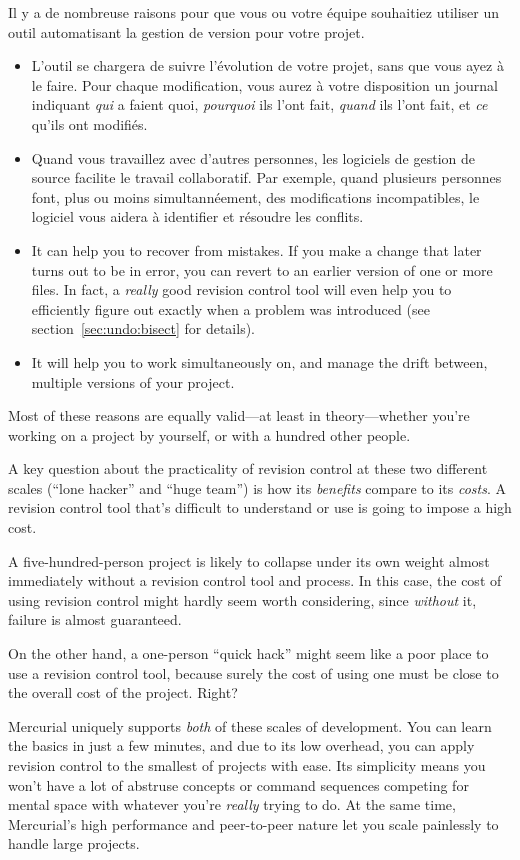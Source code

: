 Il y a de nombreuse raisons pour que vous ou votre équipe souhaitiez
utiliser un outil automatisant la gestion de version pour votre projet.
\begin{itemize}
\item L'outil se chargera de suivre l'évolution de votre projet, sans
que vous ayez à le faire. Pour chaque modification, vous aurez à votre
disposition un journal indiquant \emph{qui} a faient quoi, \emph{pourquoi}
ils l'ont fait, \emph{quand} ils l'ont fait, et \emph{ce} qu'ils ont
modifiés.
\item Quand vous travaillez avec d'autres personnes, les logiciels de 
gestion de source facilite le travail collaboratif. Par exemple, quand
plusieurs personnes font, plus ou moins simultannéement, des modifications
incompatibles, le logiciel vous aidera à identifier et résoudre les conflits.
\item It can help you to recover from mistakes.  If you make a change
  that later turns out to be in error, you can revert to an earlier
  version of one or more files.  In fact, a \emph{really} good
  revision control tool will even help you to efficiently figure out
  exactly when a problem was introduced (see
  section~\ref{sec:undo:bisect} for details).
\item It will help you to work simultaneously on, and manage the drift
  between, multiple versions of your project.
\end{itemize}
Most of these reasons are equally valid---at least in theory---whether
you're working on a project by yourself, or with a hundred other
people.

A key question about the practicality of revision control at these two
different scales (``lone hacker'' and ``huge team'') is how its
\emph{benefits} compare to its \emph{costs}.  A revision control tool
that's difficult to understand or use is going to impose a high cost.

A five-hundred-person project is likely to collapse under its own
weight almost immediately without a revision control tool and process.
In this case, the cost of using revision control might hardly seem
worth considering, since \emph{without} it, failure is almost
guaranteed.

On the other hand, a one-person ``quick hack'' might seem like a poor
place to use a revision control tool, because surely the cost of using
one must be close to the overall cost of the project.  Right?

Mercurial uniquely supports \emph{both} of these scales of
development.  You can learn the basics in just a few minutes, and due
to its low overhead, you can apply revision control to the smallest of
projects with ease.  Its simplicity means you won't have a lot of
abstruse concepts or command sequences competing for mental space with
whatever you're \emph{really} trying to do.  At the same time,
Mercurial's high performance and peer-to-peer nature let you scale
painlessly to handle large projects.

